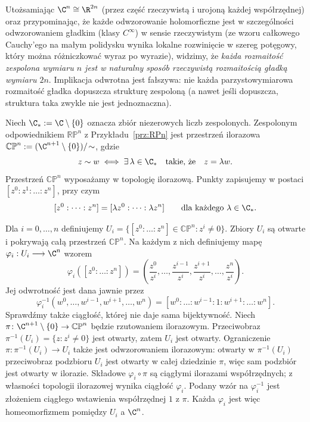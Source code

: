 \begin{uwaga}
Utożsamiając $\C^n\cong\R^{2n}$ (przez część rzeczywistą i urojoną każdej współrzędnej)
oraz przypominając, że każde odwzorowanie holomorficzne jest w szczególności odwzorowaniem
gładkim (klasy $C^\infty$) w sensie rzeczywistym (ze wzoru całkowego
Cauchy'ego na małym polidysku wynika lokalne rozwinięcie w szereg potęgowy,
który można różniczkować wyraz po wyrazie), widzimy, że \emph{każda rozmaitość zespolona
wymiaru $n$ jest w naturalny sposób rzeczywistą rozmaitością gładką wymiaru $2n$}. Implikacja
odwrotna jest fałszywa: nie każda parzystowymiarowa rozmaitość gładka dopuszcza strukturę
zespoloną (a nawet jeśli dopuszcza, struktura taka zwykle nie jest jednoznaczna).
\end{uwaga}

\begin{przyklad}
Niech $\C_*:=\C\setminus\{0\}$ oznacza zbiór niezerowych
liczb zespolonych.
Zespolonym odpowiednikiem $\mathbb{RP}^n$ z
Przykładu~\ref{prz:RPn} jest przestrzeń ilorazowa $\mathbb{CP}^n := (\C^{n+1}\setminus\{0\})/\!\sim$,
gdzie
\[
z\sim w
\iff
\exists\,\lambda\in\C_*
\quad\text{takie, że}\quad
z=\lambda w.
\]
Przestrzeń $\mathbb{CP}^n$ wyposażamy w topologię ilorazową.
Punkty zapisujemy w postaci $[z^0:z^1:\dots:z^n]$,
przy czym
\[
[z^0:\dots:z^n]
=
[\lambda z^0:\dots:\lambda z^n]
\qquad
\text{dla każdego }\lambda\in\C_*.
\]

Dla $i=0,\dots,n$ definiujemy $U_i = \{[z^0:\dots:z^n]\in\mathbb{CP}^n:z^i\neq0\}$.
Zbiory $U_i$ są otwarte i pokrywają całą przestrzeń $\mathbb{CP}^n$.
Na każdym z nich definiujemy mapę $\varphi_i:U_i\longrightarrow\C^n$
wzorem
\[
\varphi_i([z^0:\dots:z^n])
=
\left(
\frac{z^0}{z^i},
\dots,
\frac{z^{i-1}}{z^i},
\frac{z^{i+1}}{z^i},
\dots,
\frac{z^n}{z^i}
\right).
\]
Jej odwrotność jest dana jawnie przez
\[
\varphi_i^{-1}
(w^0,\dots,w^{i-1},w^{i+1},\dots,w^n)
=
[w^0:\dots:w^{i-1}:1:w^{i+1}:\dots:w^n].
\]
Sprawdźmy także ciągłość, której nie daje sama bijektywność.
Niech $\pi\colon\C^{n+1}\setminus\{0\}\to\mathbb{CP}^n$ będzie
rzutowaniem ilorazowym. Przeciwobraz $\pi^{-1}(U_i)=\{z:z^i\ne0\}$
jest otwarty, zatem $U_i$ jest otwarty. Ograniczenie
$\pi\colon\pi^{-1}(U_i)\to U_i$ także jest odwzorowaniem ilorazowym:
otwarty w $\pi^{-1}(U_i)$ przeciwobraz podzbioru $U_i$ jest otwarty
w całej dziedzinie $\pi$, więc sam podzbiór jest otwarty w ilorazie.
Składowe $\varphi_i\circ\pi$ są ciągłymi ilorazami współrzędnych;
z własności topologii ilorazowej wynika ciągłość $\varphi_i$.
Podany wzór na $\varphi_i^{-1}$ jest złożeniem ciągłego wstawienia
współrzędnej $1$ z $\pi$. Każda $\varphi_i$ jest więc homeomorfizmem
pomiędzy $U_i$ a $\C^n$.


\end{przyklad}
